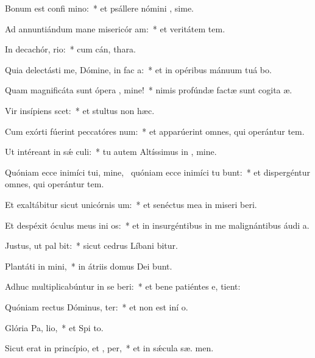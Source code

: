 \item Bonum est confi mino:~* et psállere nómini , sime.
\item Ad annuntiándum mane misericór am:~* et veritátem   tem.
\item In decachór, rio:~* cum cán,  thara.
\item Quia delectásti me, Dómine, in fac a:~* et in opéribus mánuum tuá bo.
\item Quam magnificáta sunt ópera , mine!~* nimis profúndæ factæ sunt cogita æ.
\item Vir insípiens  scet:~* et stultus non  hæc.
\item Cum exórti fúerint peccatóres  num:~* et apparúerint omnes, qui operántur tem.
\item Ut intéreant in sǽ culi:~* tu autem Altíssimus in , mine.
\item Quóniam ecce inimíci tui, mine,~\pscross{} quóniam ecce inimíci tu bunt:~* et dispergéntur omnes, qui operántur tem.
\item Et exaltábitur sicut unicórnis  um:~* et senéctus mea in miseri beri.
\item Et despéxit óculus meus ini os:~* et in insurgéntibus in me malignántibus áudi  a.
\item Justus, ut pal bit:~* sicut cedrus Líbani bitur.
\item Plantáti in  mini,~* in átriis domus Dei  bunt.
\item Adhuc multiplicabúntur in se beri:~* et bene patiéntes e,  tient:
\item Quóniam rectus Dóminus,  ter:~* et non est iní  o.
\item Glória Pa,  lio,~* et Spi to.
\item Sicut erat in princípio, et ,  per,~* et in sǽcula sæ. men.
